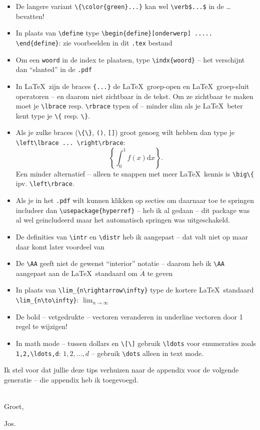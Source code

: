 \documentclass{2wa40summary}
\begin{document}
\begin{itemize}
			\item De langere variant \verb$\{\color{green}...}$ kan wel \verb#\verb$...$# in de \dots bevatten!
			\item In plaats van \verb$\define$ type \verb$\begin{define}[onderwerp] ..... \end{define}$: zie voorbeelden in dit \verb$.tex$ bestand
			\item Om een \verb$woord$ in de index te plaatsen, type \verb$\indx{woord}$ -- het verschijnt dan ``slanted'' in de \verb$.pdf$
			\item In \LaTeX\ zijn de braces \verb${...}$ de \LaTeX\ groep-open en \LaTeX\ groep-sluit operatoren -- en daarom niet zichtbaar in de tekst. Om ze zichtbaar te maken moet je \verb$\lbrace$ resp.{} \verb$\rbrace$ typen of -- minder slim als je \LaTeX\ beter kent type je \verb$\{$ resp.{} \verb$\}$.
			\item Als je zulke braces (\verb$\{\}$, \verb$()$, \verb$[]$) groot genoeg wilt hebben dan type je \verb$\left\lbrace ... \right\rbrace$:
			\[
			\left\lbrace \int_0^1 f(x) \text{d}x \right\rbrace.
			\]
			Een minder alternatief -- alleen te snappen met meer \LaTeX\ kennis is \verb$\big\{$ ipv.{} \verb$\left\rbrace$.
			\item Als je in het \verb$.pdf$ wilt kunnen klikken op secties om daarnaar toe te springen includeer dan
			\verb$\usepackage{hyperref}$ -- heb ik al gedaan -- dit package was al wel geincludeerd maar het automatisch springen was uitgeschakeld.
			\item De definities van \verb$\intr$ en \verb$\distr$ heb ik aangepast -- dat valt niet op maar daar komt later voordeel van
			\item De \verb$\AA$ geeft niet de gewenst ``interior'' notatie -- daarom heb ik \verb$\AA$ aangepast aan de \LaTeX\ standaard
			om $\mathring{A}$ te geven
			\item In plaats van \verb$\lim_{n\rightarrow\infty}$ type de kortere \LaTeX\ standaard \verb$\lim_{n\to\infty}$: $\lim_{n\to\infty}$
			\item De bold -- vetgedrukte -- vectoren veranderen in underline vectoren door 1 regel te wijzigen!
			\item In math mode -- tussen dollars en \verb$\[\]$ gebruik \verb$\ldots$ voor enumeraties zoals \verb$1,2,\ldots,d$: $1,2,\ldots,d$ -- gebruik \verb$\dots$ alleen in text mode.
		\end{itemize}
		Ik stel voor dat jullie deze tips verhuizen naar de appendix voor de volgende generatie -- die appendix heb ik toegevoegd.
		
		\ \\
		Groet,
		
		Jos.
		
%		
		\newpage
			\printindex
		
\end{document}
